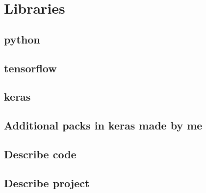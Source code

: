 
    
\section{Libraries}
    \subsection{python}
    \subsection{tensorflow}
    \subsection{keras}
    
    \subsection{Additional packs in keras made by me}
    
    \subsection{Describe code}
    
    \subsection{Describe project}
